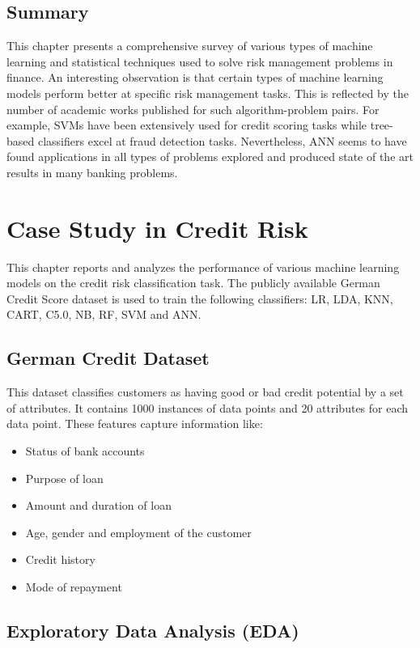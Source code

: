 \documentclass[a4paper, 12pt]{article}
\begin{document}
\vskip 0.2in
\subsection{Summary}
This chapter presents a comprehensive survey of various types of machine learning and statistical techniques used to solve risk management problems in finance. An interesting observation is that certain types of machine learning models perform better at specific risk management tasks. This is reflected by the number of academic works published for such algorithm-problem pairs. For example, SVMs have been extensively used for credit scoring tasks while tree-based classifiers excel at fraud detection tasks. Nevertheless, ANN seems to have found applications in all types of problems explored and produced state of the art results in many banking problems.


\newpage
\section{\centering Case Study in Credit Risk}
\vskip 0.25in
This chapter reports and analyzes the performance of various machine learning models on the credit risk classification task. The publicly available German Credit Score dataset is used to train the following classifiers: LR, LDA, KNN, CART, C5.0, NB, RF, SVM and ANN.

\vskip 0.2in
\subsection{German Credit Dataset}
This dataset classifies customers as having good or bad credit potential by a set of attributes. It contains 1000 instances of data points and 20 attributes for each data point. These features capture information like:
\begin{itemize}
  \item Status of bank accounts
  \item Purpose of loan
  \item Amount and duration of loan
  \item Age, gender and employment of the customer
  \item Credit history
  \item Mode of repayment
\end{itemize}

\vskip 0.2in
\subsection{Exploratory Data Analysis (EDA)}
\end{document}
